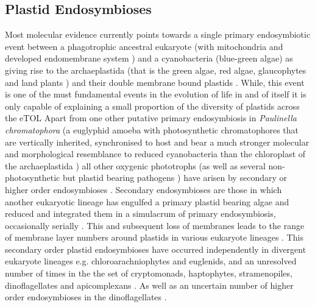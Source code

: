\subsection{Plastid Endosymbioses}
Most molecular evidence currently points towards a single primary endosymbiotic event between a phagotrophic ancestral
eukaryote (with mitochondria and developed endomembrane system \citep{Rockwell2014}) and a cyanobacteria (blue-green algae) as giving rise to 
the archaeplastida (that is the green algae, red algae, glaucophytes and land plants \citep{Green2011}) and their double membrane bound plastids \citep{Keeling2013}.   
While, this event is one of the must fundamental events in the evolution of life in and of itself it is only capable of explaining a small 
proportion of the diversity of plastids across the eTOL \citep{Keeling2013}
Apart from one other putative primary endosymbiosis in \textit{Paulinella chromatophora} (a euglyphid amoeba with photosynthetic 
chromatophores that are vertically inherited, synchronised to host and bear a much stronger molecular and morphological resemblance to reduced 
cyanobacteria than the chloroplast of the archaeplastida \citep{Kies1979,McFadden2014}) all other oxygenic phototrophs 
(as well as several non-photosynthetic but plastid bearing pathogens \citep{Sato2011}) have arisen by secondary or 
higher order endosymbioses \citep{Hoshina2009}.
Secondary endosymbioses are those in which another eukaryotic lineage has engulfed a primary plastid bearing algae and reduced and integrated them in a 
simulacrum of primary endosymbiosis, occasionally serially \citep{Keeling2010}. This and subsequent loss of membranes leads to the range of membrane
layer numbers around plastids in various eukaryote lineages \citep{Keeling2013}.  %
This secondary order plastid endosymbioses have occurred independently in divergent eukaryote lineages e.g. chloroarachniophytes and euglenids, and 
an unresolved number of times in the the set of cryptomonads, haptophytes, stramenopiles, dinoflagellates and apicomplexans \citep{Keeling2013}.  
As well as an uncertain number of higher order endosymbioses in the dinoflagellates \citep{Keeling2013}.

